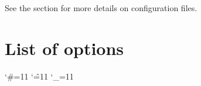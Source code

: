 See the section  for more details on
configuration files.


\section{List of options}
\label{sec:texfouhtoptions}

\begingroup
\catcode`\#=11 \catcode`\^=11 \catcode`\_=11


